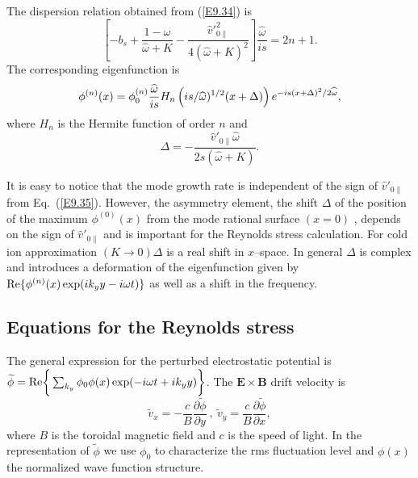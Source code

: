 \documentclass[a4paper,openany,12pt]{book}
\begin{document}
{The dispersion relation obtained from (\ref{E9.34}) is
\begin{equation}
\left[-b_s+\frac{1-\widehat\omega}{\widehat\omega+K}-\frac{\widehat v'^2_{0\|}}
{4(\widehat\omega+K)^2}\right]\frac{\widehat\omega}{is}=2n+1.\label{E9.35}
\end{equation}
The corresponding eigenfunction is
\begin{equation}
\phi^{(n)}(x)=\phi_0^{(n)}{\widehat\omega\over is}H_n
\left(is/\widehat\omega)^{1/2}(x+\Delta)\right)e^{-is(x+\Delta)^2/2\widehat\omega},\label{E9.36}
\end{equation}
where $H_n$ is the Hermite function of order $n$ and
\begin{equation}
\Delta=-\frac{\widehat v'_{0\|}\widehat\omega}{2s(\widehat\omega+K)}.\label{E9.37}
\end{equation}

It is easy to notice that the mode growth rate is independent of the sign of $\widehat v'_{0\|}$ from Eq.~(\ref{E9.35}). However, the asymmetry element, the shift $\Delta$ of the position of the maximum $\phi^{(0)}(x)$ from the mode rational surface $(x=0)$ , depends on the sign of $\widehat v'_{0\|}$ and is important for the Reynolds stress calculation. For cold ion approximation $(K\to 0)\Delta$ is a real shift in $x$--space. In general 
$\Delta$ is complex and introduces a deformation of the eigenfunction given by ${\rm Re}\{\phi^{(n)}(x)\exp(ik_y y-i\omega t)\}$ as well as a shift in the frequency.

\subsection{Equations for the Reynolds stress}
\label{EqRey}

The general expression for the perturbed electrostatic potential is $\widetilde\phi={\rm Re}\bigg\{\sum_{k_y}\phi_0\phi(x)\exp(-i\omega t+ ik_yy)\bigg\}$. The $\bm{E\times B}$ drift velocity is
\begin{equation}
\widetilde v_x=-\frac{c}{B}\frac{\partial\widetilde\phi}{\partial y}\ ,\ \widetilde v_y=\frac{c}{B}\frac{\partial\widetilde\phi}{\partial x},\label{E9.38}
\end{equation}
where $B$ is the toroidal magnetic field and $c$ is the speed of light. In the representation of $\widetilde\phi$ we use $\phi_0$ to characterize the rms fluctuation level and $\phi(x)$ the normalized wave function structure. 

}
\end{document}
